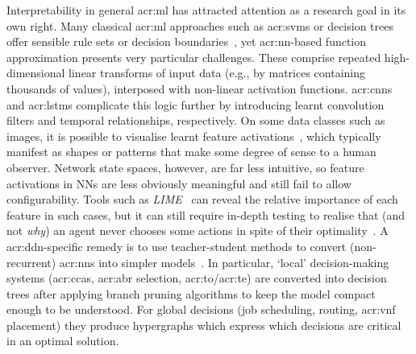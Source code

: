 Interpretability in general \gls{acr:ml} has attracted attention as a research goal in its own right.
Many classical \gls{acr:ml} approaches such as \glspl{acr:svm} or decision trees offer sensible rule sets or decision boundaries~\parencite{DBLP:conf/pkdd/MolnarCB20,interpretable-ml}, yet \gls{acr:nn}-based function approximation presents very particular challenges.
These comprise repeated high-dimensional linear transforms of input data (e.g., by matrices containing thousands of values), interposed with non-linear activation functions.
\glspl{acr:cnn} and \glspl{acr:lstm} complicate this logic further by introducing learnt convolution filters and temporal relationships, respectively.
On some data classes such as images, it is possible to visualise learnt feature activations~\parencite{cnn-features-distil}, which typically manifest as shapes or patterns that make some degree of sense to a human observer.
Network state spaces, however, are far less intuitive, so feature activations in NNs are less obviously meaningful and still fail to allow configurability.
Tools such as \emph{LIME}~\parencite{DBLP:conf/kdd/Ribeiro0G16} can reveal the relative importance of each feature in such cases, but it can still require in-depth testing to realise that (and not \emph{why}) an agent never chooses some actions in spite of their optimality~\parencite{DBLP:conf/sigcomm/DethiseCK19}.
A \gls{acr:ddn}-specific remedy is to use teacher-student methods to convert (non-recurrent) \glspl{acr:nn} into simpler models~\parencite{DBLP:conf/sigcomm/MengWBXMH20}.
In particular, `local' decision-making systems (\glspl{acr:cca}, \gls{acr:abr} selection, \gls{acr:to}/\gls{acr:te}) are converted into decision trees after applying branch pruning algorithms to keep the model compact enough to be understood.
For global decisions (job scheduling, routing, \gls{acr:vnf} placement) they produce hypergraphs which express which decisions are critical in an optimal solution.
